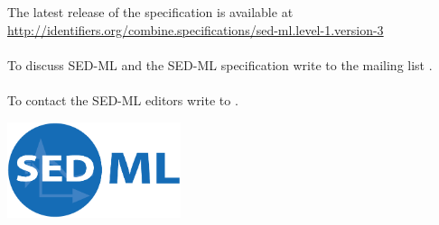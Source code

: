 \begin{titlepage}
\begin{center}
\vspace{1.2in}

\normalsize
\begin{minipage}{5in}
\begin{center}
  The latest release of the \currentLV specification is available at
  \url{http://identifiers.org/combine.specifications/sed-ml.level-1.version-3}
  \paragraph*{}
  To discuss SED-ML and the SED-ML specification write to the mailing list .

  \paragraph*{}
  To contact the SED-ML editors write to .
\end{center}
\end{minipage}
\vfill


\centerline{\includegraphics[width=2in]{images/logoSedml.png}}

\end{center}

\end{titlepage}

%
%

\setcounter{page}{2}



